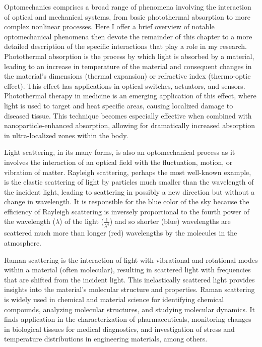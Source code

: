 Optomechanics comprises a broad range of phenomena involving the interaction of optical and mechanical systems, from basic photothermal absorption to more complex nonlinear processes. Here I offer a brief overview of notable optomechanical phenomena then devote the remainder of this chapter to a more detailed description of the specific interactions that play a role in my research. Photothermal absorption is the process by which light is absorbed by a material, leading to an increase in temperature of the material and consequent changes in the material's dimensions (thermal expansion) or refractive index (thermo-optic effect). This effect has applications in optical switches\cite{}, actuators\cite{}, and sensors\cite{}. Photothermal therapy in medicine is an emerging application of this effect, where light is used to target and heat specific areas, causing localized damage to diseased tissue\cite{}. This technique becomes especially effective when combined with nanoparticle-enhanced absorption, allowing for dramatically increased absorption in ultra-localized zones within the body.

Light scattering, in its many forms, is also an optomechanical process as it involves the interaction of an optical field with the fluctuation, motion, or vibration of matter. Rayleigh scattering, perhaps the most well-known example, is the elastic scattering of light by particles much smaller than the wavelength of the incident light, leading to scattering in possibly a new direction but without a change in wavelength. It is responsible for the blue color of the sky because the efficiency of Rayleigh scattering is inversely proportional to the fourth power of the wavelength ($\lambda$) of the light ($\frac{1}{\lambda^{4}}$) and so shorter (blue) wavelengths are scattered much more than longer (red) wavelengths by the molecules in the atmosphere.

Raman scattering is the interaction of light with vibrational and rotational modes within a material (often molecular), resulting in scattered light with frequencies that are shifted from the incident light. This inelastically scattered light provides insights into the material's molecular structure and properties. Raman scattering is widely used in chemical and material science for identifying chemical compounds, analyzing molecular structures, and studying molecular dynamics. It finds application in the characterization of pharmaceuticals\cite{}, monitoring changes in biological tissues for medical diagnostics\cite{}, and investigation of stress and temperature distributions in engineering materials\cite{}, among others\cite{}.

